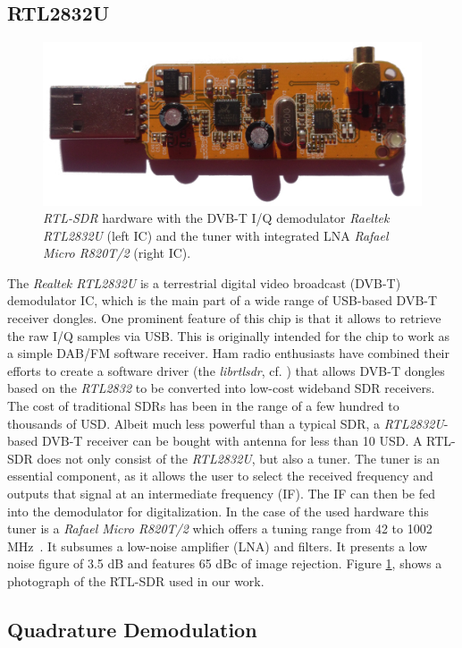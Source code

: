 \documentclass[conference]{IEEEtran}
\begin{document}
\subsection{RTL2832U}
\label{sub:rtl2832}
 \begin{figure}[h]
 \centering
\includegraphics[width=0.5\columnwidth]{./fig/rtlsdr.jpg}
\caption{\textit{RTL-SDR} hardware with the DVB-T I/Q demodulator
\textit{Raeltek RTL2832U} (left IC) and the tuner with integrated LNA
\textit{Rafael Micro R820T/2} (right IC).}
 \label{fig:receiver_arch}
\end{figure}
The \textit{Realtek RTL2832U} is a terrestrial digital video broadcast
(DVB-T) demodulator IC, which is the main part of a wide range of
USB-based DVB-T receiver dongles. One prominent feature of this chip is
that it allows to retrieve the raw I/Q samples via USB. This is
originally intended for the chip to work as a simple DAB/FM software
receiver. Ham radio enthusiasts have combined their efforts to create a
software driver (the \textit{librtlsdr}, cf. \cite{steve-m_librtlsdr})
that allows DVB-T dongles based on the \textit{RTL2832} to be converted
into low-cost wideband SDR receivers. The cost of traditional SDRs has
been in the range of a few hundred to thousands of USD. Albeit much less
powerful than a typical SDR, a \textit{RTL2832U}-based DVB-T receiver
can be bought with antenna for less than 10 USD.  A RTL-SDR does not
only consist of the \textit{RTL2832U}, but also a tuner. The tuner is an
essential component, as it allows the user to select the received
frequency and outputs that signal at an intermediate frequency (IF). The
IF can then be fed into the demodulator for digitalization. In the case
of the used hardware this tuner is a \textit{Rafael Micro R820T/2} which
offers a tuning range from 42 to 1002 MHz~\cite{rafael_r820t_2011}. It
subsumes a low-noise amplifier (LNA) and filters. It presents a low
noise figure of 3.5 dB and features 65 dBc of image rejection. Figure
\ref{fig:receiver_arch}, shows a photograph of the RTL-SDR used in our
work. 

\subsection{Quadrature Demodulation}
\end{document}
